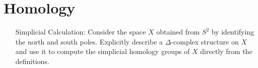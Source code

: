 \documentclass[12pt]{article} %
\theoremstyle{definition}
\begin{document}
\section*{Homology}
\begin{enumerate}
    \item[Simplicial Calculation:] Consider the space $X$ obtained from $S^{2}$ by identifying the north and south poles.
Explicitly describe a $\Delta$-complex structure on $X$ and use it to compute the simplicial homology groups of $X$ directly from the definitions.
\end{enumerate}
\end{document}
